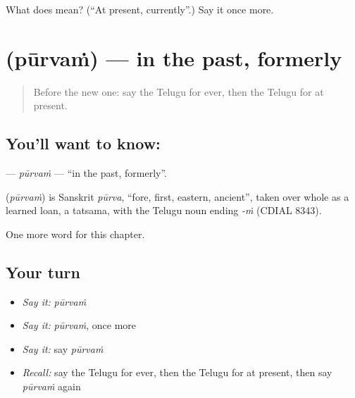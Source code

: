 \begin{tcolorbox}[breakable,colback=teal!4,colframe=teal!35!black,title={Before you move on}]
What does  mean? (\textquotedblleft{}At present, currently\textquotedblright{}.) Say it once more.
\end{tcolorbox}
\section[\texorpdfstring{\te{పూర్వం} (pūrvaṁ)}{పూర్వం (pūrvaṁ)}]{ (pūrvaṁ) — in the past, formerly}

\label{lesson:TE-C253-purvam}



\begin{quote}
Before the new one: say the Telugu for ever, then the Telugu for at present.
\end{quote}

\subsection*{You'll want to know: }
\textbf{} — \emph{pūrvaṁ} — \textquotedblleft{}in the past, formerly\textquotedblright{}.

\begin{cousinweb}
\textbf{} (\emph{pūrvaṁ}) is Sanskrit \emph{pūrva}, \textquotedblleft{}fore, first, eastern, ancient\textquotedblright{}, taken over whole as a learned loan, a tatsama, with the Telugu noun ending \emph{-ṁ} (CDIAL 8343).
\end{cousinweb}

\begin{grammarlens}[title={What you've built}]
One more word for this chapter.
\end{grammarlens}

\subsection*{Your turn}
\begin{itemize}
\raggedright
  \item \emph{Say it:} \emph{pūrvaṁ}
  \item \emph{Say it:} \emph{pūrvaṁ}, once more
  \item \emph{Say it:} say \emph{pūrvaṁ}
  \item \emph{Recall:} say the Telugu for ever, then the Telugu for at present, then say \emph{pūrvaṁ} again
\end{itemize}


